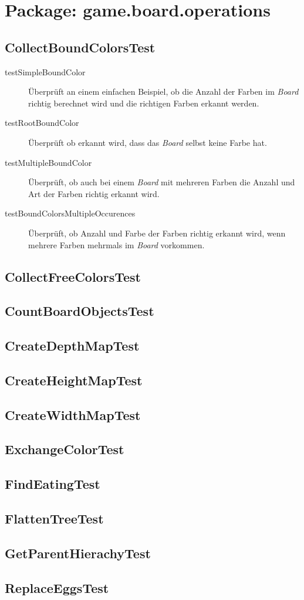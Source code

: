 \section{Package: game.board.operations}
\subsection{CollectBoundColorsTest}
	\begin{description}
		\item[testSimpleBoundColor] Überprüft an einem einfachen Beispiel, ob die Anzahl der Farben im \emph{Board} richtig
			berechnet wird und die richtigen Farben erkannt werden.
		\item[testRootBoundColor] Überprüft ob erkannt wird, dass das \emph{Board} selbst keine Farbe hat. 
		\item[testMultipleBoundColor] Überprüft, ob auch bei einem \emph{Board} mit mehreren Farben die Anzahl und Art der 
			Farben richtig erkannt wird.
		\item[testBoundColorsMultipleOccurences]Überprüft, ob Anzahl und Farbe der Farben richtig erkannt wird, wenn mehrere 
			Farben mehrmals im \emph{Board} vorkommen. 
	\end{description}
\subsection{CollectFreeColorsTest}
\subsection{CountBoardObjectsTest}
\subsection{CreateDepthMapTest}
\subsection{CreateHeightMapTest}
\subsection{CreateWidthMapTest}
\subsection{ExchangeColorTest}
\subsection{FindEatingTest}
\subsection{FlattenTreeTest}
\subsection{GetParentHierachyTest}
\subsection{ReplaceEggsTest}
